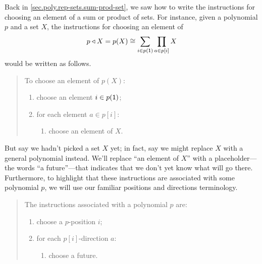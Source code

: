 \documentclass[Book-Poly]{subfiles}
\begin{document}
Back in \cref{sec.poly.rep-sets.sum-prod-set}, we saw how to write the instructions for choosing an element of a sum or product of sets.
For instance, given a polynomial $p$ and a set $X$, the instructions for choosing an element of
\[
    p\mathbin{\triangleleft} X=p(X)\cong\sum_{i\in p(\textsf{1})}\prod_{a\in p[i]}X
\]
would be written as follows.
\begin{quote}
To choose an element of $p(X)$:
\begin{enumerate}
    \item choose an element $i\in p(\textsf{1})$;
    \item for each element $a\in p[i]$:
    \begin{enumerate}[label*=\arabic*.]
        \item choose an element of $X$.
    \end{enumerate}
\end{enumerate}
\end{quote}
But say we hadn't picked a set $X$ yet; in fact, say we might replace $X$ with a general polynomial instead.
We'll replace ``an element of $X$'' with a placeholder---the words ``a future''---that indicates that we don't yet know what will go there.
Furthermore, to highlight that these instructions are associated with some polynomial $p$, we will use our familiar positions and directions terminology.
\begin{quote}
The instructions associated with a polynomial $p$ are:
\begin{enumerate}
    \item choose a $p$-position $i$;
    \item for each $p[i]$-direction $a$:
    \begin{enumerate}[label*=\arabic*.]
        \item choose a future.
    \end{enumerate}
\end{enumerate}
\end{quote}
\end{document}
